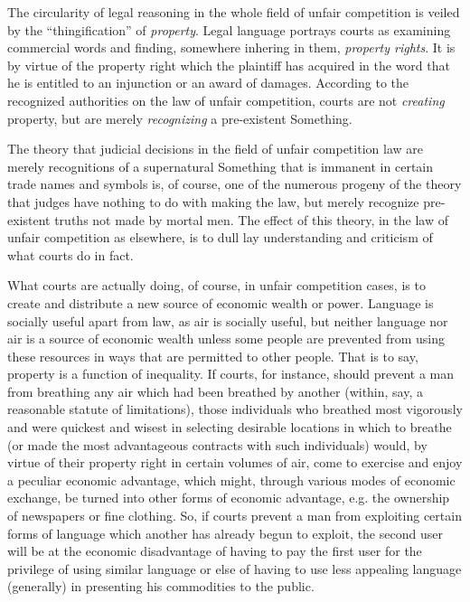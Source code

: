 The circularity of legal reasoning in the whole field of unfair competition is
veiled by the ``thingification'' of \textit{property}. Legal language portrays
courts as examining commercial words and finding, somewhere inhering in them,
\textit{property rights}. It is by virtue of the property right which the
plaintiff has acquired in the word that he is entitled to an injunction or an
award of damages. According to the recognized authorities on the law of unfair
competition, courts are not \textit{creating} property, but are merely
\textit{recognizing} a pre-existent Something. 

The theory that judicial decisions in the field of unfair competition law are
merely recognitions of a supernatural Something that is immanent in certain
trade names and symbols is, of course, one of the numerous progeny of the
theory that judges have nothing to do with making the law, but merely recognize
pre-existent truths not made by mortal men. The effect of this theory, in the
law of unfair competition as elsewhere, is to dull lay understanding and
criticism of what courts do in fact. 

What courts are actually doing, of course, in unfair competition cases, is to
create and distribute a new source of economic wealth or power. Language is
socially useful apart from law, as air is socially useful, but neither language
nor air is a source of economic wealth unless some people are prevented from
using these resources in ways that are permitted to other people. That is to
say, property is a function of inequality. If courts, for instance, should
prevent a man from breathing any air which had been breathed by another
(within, say, a reasonable statute of limitations), those individuals who
breathed most vigorously and were quickest and wisest in selecting desirable
locations in which to breathe (or made the most advantageous contracts with
such individuals) would, by virtue of their property right in certain volumes
of air, come to exercise and enjoy a peculiar economic advantage, which might,
through various modes of economic exchange, be turned into other forms of
economic advantage, e.g. the ownership of newspapers or fine clothing. So, if
courts prevent a man from exploiting certain forms of language which another
has already begun to exploit, the second user will be at the economic
disadvantage of having to pay the first user for the privilege of using similar
language or else of having to use less appealing language (generally) in
presenting his commodities to the public. 

